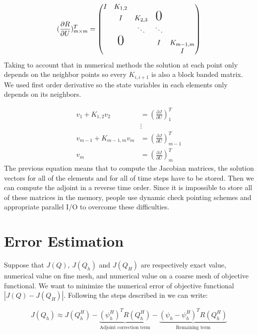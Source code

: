 \documentclass[a4paper,10pt]{article}
\begin{document}
\begin{equation}
   (\frac{\partial R}{\partial U})_{m \times m}^T =
   \begin{pmatrix}
  I & K_{1,2}        &         &               &          \\
    & I              & K_{2,3} & \text{\huge0} &          \\
    &                & \ddots  & \ddots        &          \\
    & \text{\huge0}  &         & I             & K_{m-1,m}\\
    &                &         &               & I
 \end{pmatrix}
  \end{equation}  
Taking to account that in numerical methods the solution at each point only depends on the neighbor points so every $K_{i,i+1}$
is also a block banded matrix. We used first order derivative so the state variables in each elements only depends on its neighbors.

\begin{equation}
  \begin{aligned}
 v_1 + K_{1,2} v_2 &=\left(\frac{\partial J}{\partial U}\right)_1^T \\
 &\vdots\\
 v_{m-1} + K_{m-1,m} v_m &=\left(\frac{\partial J}{\partial U}\right)_{m-1}^T \\
v_m &=\left(\frac{\partial J}{\partial U}\right)_m^T
 \end{aligned}
\end{equation}
The previous equation means that to compute the Jacobian matrices, the solution vectors for all of the elements and for all of time steps 
 have to be stored. Then we can compute the adjoint in a reverse time order.
 Since it is impossible to store all of these matrices in the memory, people use dynamic check pointing schemes 
 and appropriate parallel I/O to overcome these difficulties.
\section{Error Estimation}

Suppose that $ J(Q) $, $ J(Q_h) $ and $ J(Q_H) $ are respectively exact value, numerical value on fine mesh, and numerical value on a coarse mesh of objective functional. We want to minimize the numerical error of objective functional $ |J(Q) - J(Q_H)| $. Following the steps described in \cite{Nemec2008} we can write:

\[
J(Q_h) \approx  J(Q^H_h) - \underbrace{(\psi^H_h)^T R(Q^H_h)}_\text{Adjoint correction term} - 
\underbrace{(\psi_h - \psi^H_h)^T R(Q^H_h)}_\text{Remaining term}
\]
\end{document}
